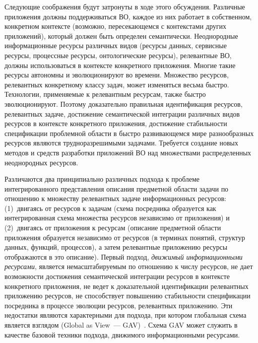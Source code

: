 \begin{multicols}{2}
     Следующие соображения будут затронуты в ходе этого обсуждения. Различные
приложения должны поддерживаться ВО, каждое из них работает в собственном,
конкретном контексте (возможно, пересекающемся с контекстами других приложений),
который должен быть определен семантически. Неоднородные информационные ресурсы
различных видов (ресурсы данных, сервисные ресурсы, процессные ресурсы,
онтологические ресурсы), релевантные ВО, должны использоваться в контексте
конкретного приложения. Многие такие ресурсы автономны и эволюционируют во
времени. Множество ресурсов, релевантных конкретному классу задач, может изменяться
весьма быстро. Технологии, применяемые к релевантным ресурсам, также быстро
эволюционируют. Поэтому доказательно правильная идентификация ресурсов,
релевантных задаче, достижение семантической интеграции различных видов ресурсов в
контексте конкретного %
приложения, достижение стабильности спецификации проблемной
области в быстро развивающемся мире разнообразных ресурсов являются
трудноразрешимыми задачами. Требуется создание %
\mbox{новых} методов и средств разработки
приложений ВО над множествами распределенных неоднородных ресурсов.

     Различаются два принципиально различных подхода к проблеме интегрированного
представления описания предметной области задачи по отношению к множеству
релевантных задаче информационных ресурсов: (1)~двигаясь от ресурсов к задачам (схема
посредника образуется как интегрированная схема множества ресурсов независимо от
приложения) и (2)~двигаясь от приложения к ресурсам (описание предметной области
приложения образуется независимо от ресурсов (в терминах понятий, структур данных,
функций, процессов), а затем релевантные приложению ресурсы отображаются в это
описание). Первый подход, \textit{движимый информационными ресурсами}, является
немасштабируемым по отношению к числу ресурсов, не дает возможности достижения
семантической интеграции ресурсов в контексте конкретного приложения, не ведет к
доказательной идентификации релевантных приложению ресурсов, не способствует
повышению стабильности спецификации посредника в процессе эволюции ресурсов,
релевантных приложению. Эти недостатки являются характерными для подхода, при
котором глобальная схема является взглядом (Global as View~--- GAV)~\cite{Ull97, Hal01}.
Схема GAV может служить в качестве базовой техники %
подхода, движимого информационными
ре\-сур\-сами.


\end{multicols}
